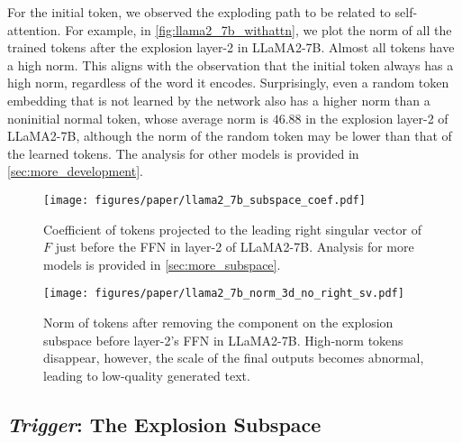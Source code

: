 For the initial token, we observed the exploding path to be related to self-attention.
For example, in \cref{fig:llama2_7b_withattn}, we plot the norm of all the trained tokens after the explosion layer-2 in LLaMA2-7B.
Almost all tokens have a high norm.
This aligns with the observation that the initial token always has a high norm, regardless of the word it encodes.
Surprisingly, even a random token embedding that is not learned by the network also has a higher norm than a noninitial normal token, whose average norm is \(46.88\) in the explosion layer-2 of LLaMA2-7B, although the norm of the random token may be lower than that of the learned tokens.
The analysis for other models is provided in \cref{sec:more_development}.

\begin{figure}[t]
    \begin{center}
        \centerline{\texttt{[image: figures/paper/llama2\_7b\_subspace\_coef.pdf]}}
    \vspace{-0.5em}
    \caption{Coefficient of tokens projected to the leading right singular vector of \(F\) just before the FFN in layer-2 of LLaMA2-7B.
        Analysis for more models is provided in \cref{sec:more_subspace}.
        }\label{fig:llama2_7b_subspace_coef}
    \vspace{-1.5em}
\end{center}
\end{figure}

\begin{figure}[t]
    \begin{center}
        \texttt{[image: figures/paper/llama2\_7b\_norm\_3d\_no\_right\_sv.pdf]}
    \vspace{-0.5em}
    \caption{Norm of tokens after removing the component on the explosion subspace before layer-2's FFN in LLaMA2-7B\@.
            High-norm tokens disappear, however, the scale of the final outputs becomes abnormal, leading to low-quality generated text.
        }\label{fig:llama2_7b_trim}
    \vspace{-1.5em}
\end{center}
\end{figure}

\subsection{\emph{Trigger}: The Explosion Subspace}

